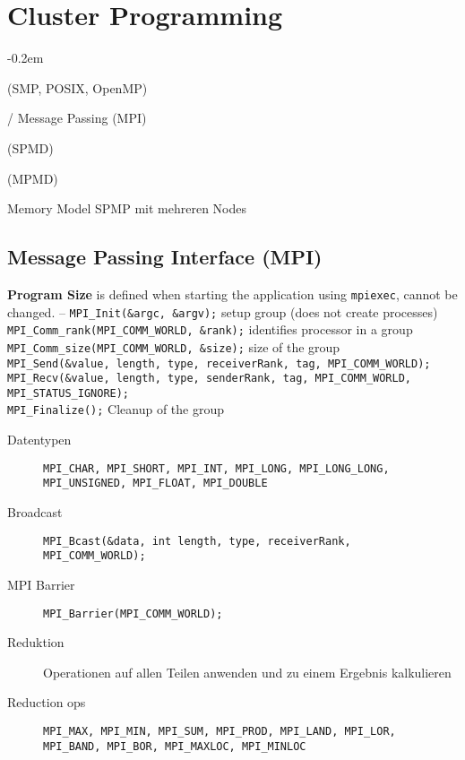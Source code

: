 \section{Cluster Programming}
\begin{description}
	\itemsep -0.2em
	\item [Shared Memory] (SMP, POSIX, OpenMP)
	\item [Distributed Memory] / Message Passing (MPI)
	\item [Single Program Multiple Data] (SPMD)
	\item [Multiple Program Multiple Data] (MPMD)
	\item [HPC Hybrid] Memory Model SPMP mit mehreren Nodes
\end{description}

\subsection{Message Passing Interface (MPI)}
\textbf{Program Size} is defined when starting the application using \texttt{mpiexec}, cannot be changed.  --
\texttt{MPI\_Init(\&argc, \&argv);} setup group (does not create processes) \\
\texttt{MPI\_Comm\_rank(MPI\_COMM\_WORLD, \&rank);} identifies processor in a group \\
\texttt{MPI\_Comm\_size(MPI\_COMM\_WORLD, \&size);} size of the group \\
\texttt{MPI\_Send(\&value, length, type, receiverRank, tag, MPI\_COMM\_WORLD);}\\
\texttt{MPI\_Recv(\&value, length, type, senderRank, tag, MPI\_COMM\_WORLD, MPI\_STATUS\_IGNORE);} \\
\texttt{MPI\_Finalize();} Cleanup of the group

\begin{description}
  \item[Datentypen] \texttt{MPI\_CHAR, MPI\_SHORT, MPI\_INT, MPI\_LONG, MPI\_LONG\_LONG, MPI\_UNSIGNED, MPI\_FLOAT, MPI\_DOUBLE}
  \item[Broadcast] \texttt{MPI\_Bcast(\&data, int length, type, receiverRank, MPI\_COMM\_WORLD);}
  \item[MPI Barrier] \texttt{MPI\_Barrier(MPI\_COMM\_WORLD);}
  \item[Reduktion] Operationen auf allen Teilen anwenden und zu einem Ergebnis kalkulieren
  \item[Reduction ops] \texttt{MPI\_MAX, MPI\_MIN, MPI\_SUM, MPI\_PROD, MPI\_LAND, MPI\_LOR, MPI\_BAND, MPI\_BOR, MPI\_MAXLOC, MPI\_MINLOC}
\end{description}

